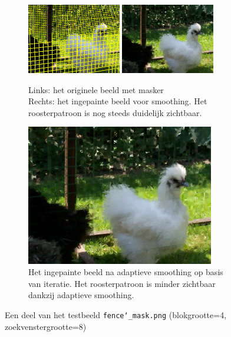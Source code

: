 \documentclass[titlepage]{article}
\begin{document}
\begin{figure}[H]
\centering
\begin{subfigure}[b]{\linewidth}
	\centering
    \captionsetup{justification=centering}
    \includegraphics[width=0.45\textwidth]{fence_mask}
    \includegraphics[width=0.45\textwidth]{fence_unsmoothed}
    \caption{Links: het originele beeld met masker\\Rechts: het ingepainte beeld voor smoothing. Het roosterpatroon is nog steeds duidelijk zichtbaar.}
\end{subfigure}

\begin{subfigure}[b]{\linewidth}
	\centering
    \captionsetup{justification=centering}
    \includegraphics[width=0.9\textwidth]{fence_adaptive_iter}
    \caption{Het ingepainte beeld na adaptieve smoothing op basis van iteratie. Het roosterpatroon is minder zichtbaar dankzij adaptieve smoothing.}
\end{subfigure}
\caption{Een deel van het testbeeld \texttt{fence\char`_mask.png} (blokgrootte=4, zoekvenstergrootte=8)} \label{fig:fence}
\end{figure}
\end{document}
